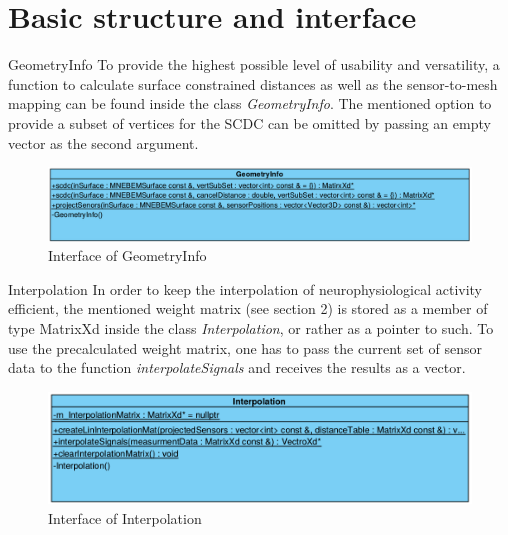 \documentclass[a4paper, 11pt, english, fleqn]{article}
\begin{document}
\section{Basic structure and interface}

\begin{aims}
	\item[GeometryInfo] To provide the highest possible level of usability and versatility, a function to calculate surface constrained distances as well as the sensor-to-mesh mapping can be found inside the class \textit{GeometryInfo}. The mentioned option to provide a subset of vertices for the SCDC can be omitted by passing an empty vector as the second argument. 

\begin{figure}[h]
	\begin{center}
		\includegraphics[width=12cm]{figures/geometryinfoclassdiagram.png}
		\caption{Interface of GeometryInfo}
	\end{center}
\end{figure}

\item[Interpolation] In order to keep the interpolation of neurophysiological activity efficient, the mentioned weight matrix (see section 2) is stored as a member of type MatrixXd inside the class \textit{Interpolation}, or rather as a pointer to such.
To use the precalculated weight matrix, one has to pass the current set of sensor data to the function \textit{interpolateSignals} and receives the results as a vector.

\begin{figure}[h]
	\begin{center}
		\includegraphics[width=12cm]{figures/interpolationclassdiagram.png}
		\caption{Interface of Interpolation}
	\end{center}
\end{figure}

\clearpage


\end{aims}
\end{document}
